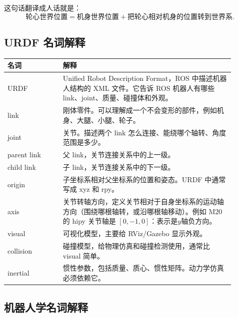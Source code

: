 \documentclass[UTF8,11pt,a4paper]{ctexart}
\begin{document}
这句话翻译成人话就是：
\[
\text{轮心世界位置}
=
\text{机身世界位置}
+
\text{把轮心相对机身的位置转到世界系}.
\]

\subsection{URDF 名词解释}

\begin{center}
\begin{tabular}{p{0.22\linewidth}p{0.68\linewidth}}
\toprule
名词 & 解释 \\
\midrule
URDF & Unified Robot Description Format，ROS 中描述机器人结构的 XML 文件。它告诉 ROS 机器人有哪些 link、joint、质量、碰撞体和外观。\\
link & 刚体零件。可以理解成一个不会变形的部件，例如机身、大腿、小腿、轮子。\\
joint & 关节。描述两个 link 怎么连接、能绕哪个轴转、角度范围是多少。\\
parent link & 父 link，关节连接关系中的上一级。\\
child link & 子 link，关节连接关系中的下一级。\\
origin & 子坐标系相对父坐标系的位置和姿态。URDF 中通常写成 xyz 和 rpy。\\
axis & 关节转轴方向，定义关节相对于自身坐标系的运动轴方向（围绕哪根轴转，或沿哪根轴移动）。例如 M20 的 hipy 关节轴是 \([0,-1,0]：表示是y轴负方向\)。\\
visual & 可视化模型，主要给 RViz/Gazebo 显示外观。\\
collision & 碰撞模型，给物理仿真和碰撞检测使用，通常比 visual 简单。\\
inertial & 惯性参数，包括质量、质心、惯性矩阵。动力学仿真必须依赖它。\\
\bottomrule
\end{tabular}
\end{center}

\subsection{机器人学名词解释}
\end{document}
